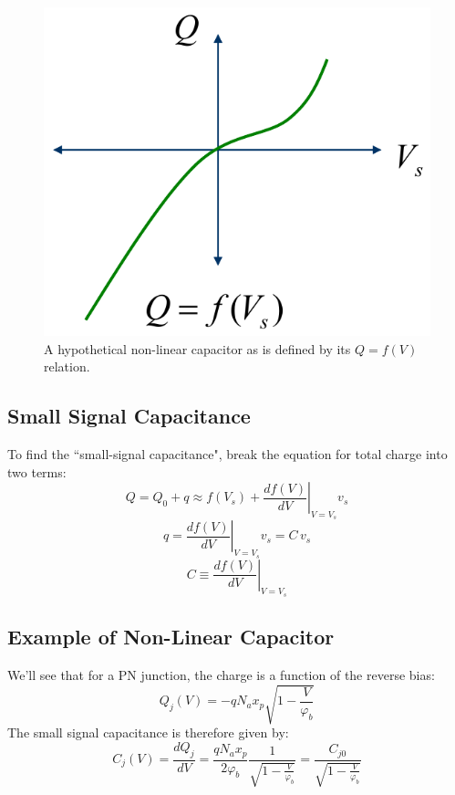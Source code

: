 \begin{figure}[tb]
\centering
\includegraphics[width=.35\columnwidth]{mod2-2_ICtech_sld_20} 
\caption{A hypothetical non-linear capacitor as is defined by its $Q = f(V)$ relation.} \label{fig:mod2-2_ICtech_sld_20}
\end{figure}
\subsection{Small Signal Capacitance}
To find the ``small-signal capacitance", break the equation for total charge into two terms:
    \begin{equation} 
        Q = {Q_0} + q \approx f({V_s}) + {\left. {\frac{{df(V)}}{{dV}}} \right|_{V = {V_s}}}{v_s} 
    \end{equation}
    \begin{equation} 
        q = {\left. {\frac{{df(V)}}{{dV}}} \right|_{V = {V_s}}}{v_s} = C\,{v_s} 
    \end{equation}
    \begin{equation} 
        C \equiv {\left. {\frac{{df(V)}}{{dV}}} \right|_{V = {V_s}}} 
    \end{equation}
\subsection{Example of Non-Linear Capacitor}
We’ll see that for a PN junction, the charge is a function of the reverse bias:
    \begin{equation} 
        {Q_j}(V) =  - q{N_a}{x_p}\sqrt {1 - \frac{V}{{{\varphi _b}}}} 
    \end{equation}
The small signal capacitance is therefore given by:
    \begin{equation} 
        {C_j}(V) = \frac{{dQ_j^{}}}{{dV}} = \frac{{q{N_a}{x_p}}}{{2{\varphi _b}}}\frac{1}{{\sqrt {1 - \frac{V}{{{\varphi _b}}}}}} = \frac{{C_{j0}^{}}}{{\sqrt {1 - \frac{V}{{{\varphi _b}}}}}} 
    \end{equation}
